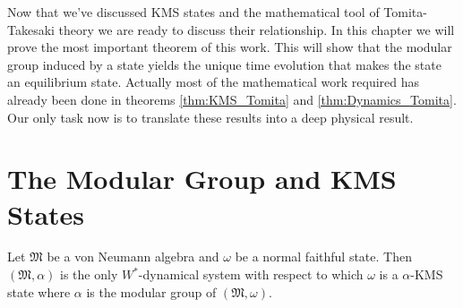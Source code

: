 Now that we've discussed KMS states and the mathematical tool of Tomita-Takesaki theory we are ready to discuss their relationship. In this chapter we will prove the most important theorem of this work. This will show that the modular group induced by a state yields the unique time evolution that makes the state an equilibrium state. Actually most of the mathematical work required has already been done in theorems \ref{thm:KMS_Tomita} and \ref{thm:Dynamics_Tomita}. Our only task now is to translate these results into a deep physical result. 

\section{The Modular Group and KMS States}

\begin{theorem}
Let $\mathfrak{M}$ be a von Neumann algebra and $\omega$ be a normal faithful state. Then $(\mathfrak{M},\alpha)$ is the only $W^*$-dynamical system with respect to which $\omega$ is a $\alpha$-KMS state where $\alpha$  is the modular group of $(\mathfrak{M},\omega)$.
\end{theorem} 

